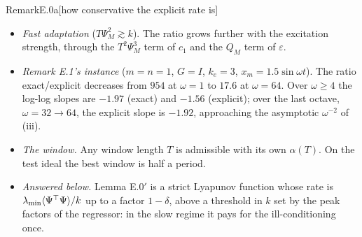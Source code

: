 \begin{rmk}{Remark}{E.0a}[how conservative the explicit rate is]
\begin{itemize}
    $4.9\cdot10^5$: on this instance the exact rate is $0.66$ of $\lambda_{\min}\langle\Psi^\T\Psi\rangle/k$ at every
    $g$ ($k_e=6$ is not large against the reference's bandwidth; the two last columns of the table), and the
    $T^2\Psi_M^3$ term is still $13\%$ of $c_1$ at $g=0.01$ ($(c_1/c_1^\infty)^2=1.31$); their product,
    $0.66\times1.31=0.86$, brings $4.9\cdot10^5$ to $4.2\cdot10^5$. The ratio is still decreasing at $g=0.01$ and
    tends to about $0.66\cdot\kappa_\Psi(1+\Psi_D/(k_e\Psi_M))^2\approx3.2\cdot10^5$ as $g\to0$. In the mean-field
    normalisation $\Psi_G\propto m^{-1/2}$, so large networks sit in this regime at fixed geometry.
  \item \emph{Fast adaptation} ($T\Psi_M^2\gtrsim k$). The ratio grows further with the excitation strength, through
    the $T^2\Psi_M^3$ term of $c_1$ and the $Q_M$ term of $\varepsilon$.
  \item \emph{Remark E.1's instance} ($m=n=1$, $G=I$, $k_e=3$, $x_m=1.5\sin\omega t$). The ratio exact/explicit
    decreases from $954$ at $\omega=1$ to $17.6$ at $\omega=64$. Over $\omega\ge4$ the log-log slopes are $-1.97$
    (exact) and $-1.56$ (explicit); over the last octave, $\omega=32\to64$, the explicit slope is $-1.92$, approaching
    the asymptotic $\omega^{-2}$ of (iii).
  \item \emph{The window.} Any window length $T$ is admissible with its own $\alpha(T)$. On the test ideal the best
    window is half a period.
  \item \emph{Answered below.} Lemma E.0$'$ is a strict Lyapunov function whose rate is
    $\lambda_{\min}\langle\Psi^\T\Psi\rangle/k$ up to a factor $1-\delta$, above a threshold in $k$ set by the peak
    factors of the regressor: in the slow regime it pays for the ill-conditioning once.
\end{itemize}
\end{rmk}

